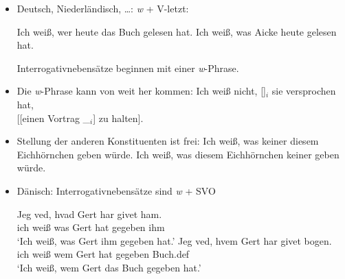 \begin{itemize}
\item Deutsch, Niederländisch, \ldots: \emph{w} + V-letzt:

\eal
\ex Ich weiß, wer heute das Buch gelesen hat.
\ex Ich weiß, was Aicke heute gelesen hat.
\zl

Interrogativnebensätze beginnen mit einer \emph{w}-Phrase.


\item Die \emph{w}-Phrase kann von weit her kommen:
\ea
Ich weiß nicht, []$_i$ sie versprochen hat,\\
{}[[einen Vortrag \_$_i$] zu halten].
\z


\item Stellung der anderen Konstituenten ist frei:
\eal
\ex Ich weiß, was keiner diesem Eichhörnchen geben würde.
\ex Ich weiß, was diesem Eichhörnchen keiner geben würde.
\zl


\end{itemize}



\begin{itemize}
\item Dänisch: Interrogativnebensätze sind \emph{w} + SVO

\eal
\ex
\gll Jeg ved, hvad Gert har givet ham.\\
     ich weiß was Gert  hat gegeben ihm\\
\glt `Ich weiß, was Gert ihm gegeben hat.'
\ex
\gll Jeg ved, hvem Gert har givet   bogen.\\
     ich weiß wem  Gert hat gegeben Buch.{\sc def}\\
\glt `Ich weiß, wem Gert das Buch gegeben hat.'
\zl

\end{itemize}


